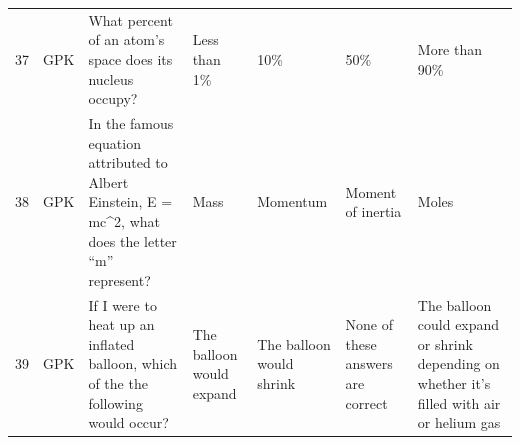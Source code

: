 \documentclass[10pt]{article}
\begin{document}
\begin{tiny}
\begin{longtable}{r P{0.3in} P{1.203in} P{0.8in} P{0.8in} P{0.8in} P{0.8in}}
    37    &      GPK &                                                                                                                                                                                                                         What percent of an atom's space does its nucleus occupy? &                                                                                                                          Less than 1\% &                                                                                                   10\% &                                                                                                                        50\% &                                                                                                                     More than 90\% \\
    38    &      GPK &                                                                                                                                                                              In the famous equation attributed to Albert Einstein, E = mc\textasciicircum 2, what does the letter ``m'' represent? &                                                                                                                                  Mass &                                                                                              Momentum &                                                                                                          Moment of inertia &                                                                                                                             Moles \\
    39    &      GPK &                                                                                                                                                                                                If I were to heat up an inflated balloon, which of the the following would occur? &                                                                                                              The balloon would expand &                                                                              The balloon would shrink &                                                                                          None of these answers are correct &                                        The balloon could expand or shrink depending on whether it's filled with air or helium gas \\
  \end{longtable}
\end{tiny}
\end{document}
